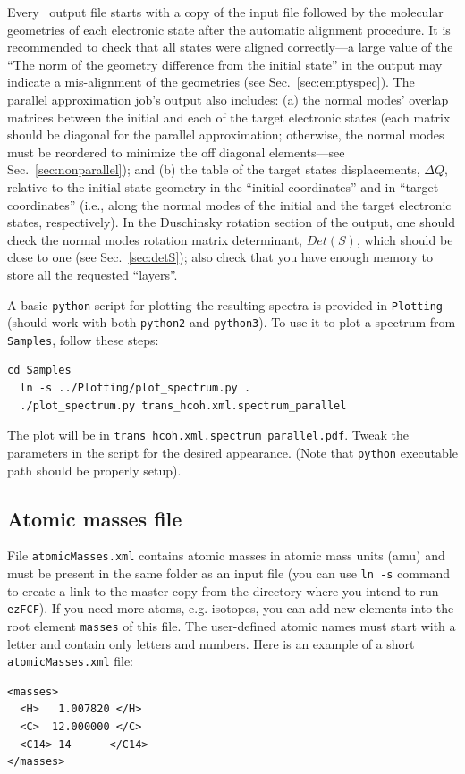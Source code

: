 \documentclass[11pt]{article}
\begin{document}
Every \ezFCF\ output file starts with a copy of the input \xml file followed by the 
molecular geometries of each electronic state after the automatic alignment procedure. 
It is recommended to check that all states were aligned correctly---a large 
value of the ``The norm of the geometry difference from the initial state'' in the output
may indicate a mis-alignment of the geometries (see Sec.~\ref{sec:emptyspec}).
The parallel approximation job's output also includes: 
(a) the normal modes' overlap matrices between the initial and each of the
target electronic states (each matrix should be diagonal for the parallel approximation;
otherwise, the normal modes must be reordered to minimize the off diagonal elements---see 
Sec.~\ref{sec:nonparallel});
and (b) the table of the target states displacements, 
$\Delta Q$, relative to the initial state geometry in the ``initial coordinates''
and in ``target coordinates'' (i.e., along the normal modes of the initial and the target electronic states, respectively).
In the Duschinsky rotation section of the output, one should check the normal modes rotation matrix determinant,
$Det(S)$, which should be close to one (see Sec.~\ref{sec:detS}); also check that you have enough
memory to store all the requested ``layers''. 

A basic {\tt python} script for plotting the resulting spectra is provided in {\tt Plotting} (should work with both {\tt python2} and {\tt python3}). To use it to plot a spectrum  from {\tt Samples}, follow these steps:
\begin{lstlisting}[frame=single,framerule=0pt]
  cd Samples
  ln -s ../Plotting/plot_spectrum.py .
  ./plot_spectrum.py trans_hcoh.xml.spectrum_parallel
\end{lstlisting}
The plot will be in {\tt trans\_hcoh.xml.spectrum\_parallel.pdf}. Tweak the parameters in the script for the desired appearance. (Note that {\tt python} executable path should be properly setup). 


\subsection{Atomic masses file}
\label{sec:masses}

File {\tt atomicMasses.xml} contains atomic masses in atomic mass units (amu) and must be present in the same folder 
as an \xml input file (you can use {\tt ln -s} command to create a link to the master copy from the directory
where you intend to run {\tt ezFCF}). 
If you need more atoms, e.g. isotopes, you can add new
elements into the root element {\tt masses} of this file. 
The user-defined atomic names must start with a letter and contain only letters and numbers.
Here is an example of a short {\tt atomicMasses.xml} file:
\begin{lstlisting}[frame=single,framerule=0pt]
<masses>
  <H>   1.007820 </H>
  <C>  12.000000 </C>
  <C14> 14      </C14>
</masses>
\end{lstlisting}
\end{document}
